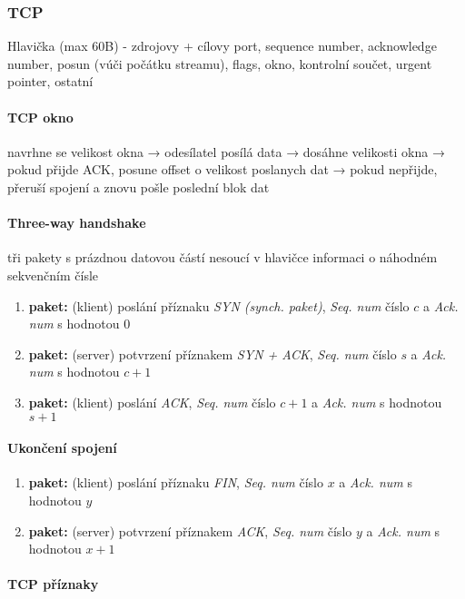 \documentclass[10pt,a4paper]{article}
\begin{document}
\subsubsection{TCP}

Hlavička (max 60B) - zdrojovy + cílovy port, sequence number, acknowledge number, posun (vúči počátku streamu), flags, okno, kontrolní součet, urgent pointer, ostatní

\paragraph{TCP okno} navrhne se velikost okna → odesílatel posílá data → dosáhne velikosti okna → pokud přijde ACK, posune offset o velikost poslanych dat → pokud nepřijde, přeruší spojení a znovu pošle poslední blok dat

\paragraph{Three-way handshake} tři pakety s prázdnou datovou částí nesoucí v hlavičce informaci o náhodném sekvenčním čísle

\begin{enumerate}
    \item \textbf{paket:} (klient) poslání příznaku \textit{SYN (synch. paket)}, \textit{Seq. num} číslo $c$ a \textit{Ack. num} s hodnotou $0$
    \item \textbf{paket:} (server) potvrzení příznakem \textit{SYN + ACK}, \textit{Seq. num} číslo $s$ a \textit{Ack. num} s hodnotou $c+1$
    \item \textbf{paket:}  (klient) poslání \textit{ACK}, \textit{Seq. num} číslo $c+1$ a \textit{Ack. num} s hodnotou $s+1$
\end{enumerate}

\paragraph{Ukončení spojení}

\begin{enumerate}
    \item \textbf{paket:} (klient) poslání příznaku \textit{FIN}, \textit{Seq. num} číslo $x$ a \textit{Ack. num} s hodnotou $y$
    \item \textbf{paket:} (server) potvrzení příznakem \textit{ACK}, \textit{Seq. num} číslo $y$ a \textit{Ack. num} s hodnotou $x+1$
\end{enumerate}

\paragraph{TCP příznaky}
\end{document}
